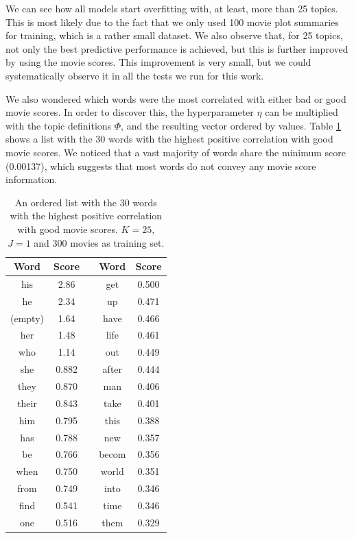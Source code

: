 \documentclass{article} %
\begin{document}
We can see how all models start overfitting with, at least, more than 25 topics.
This is most likely due to the fact that we only used 100 movie plot summaries for training, which is a rather small dataset. 
We also observe that, for 25 topics, not only the best predictive performance is achieved, but this is further improved by using the movie scores.
This improvement is very small, but we could systematically observe it in all the tests we run for this work. 

We also wondered which words were the most correlated with either bad or good movie scores. In order to discover this, the hyperparameter $\eta$ can be multiplied with the topic definitions $\Phi$, and the resulting vector ordered by values. Table \ref{table:word_scores} shows a list with the 30 words with the highest positive correlation with good movie scores. We noticed that a vast majority of words share the minimum score (0.00137), which suggests that most words do not convey any movie score information.

\begin{table}[ht!]
\captionsetup{justification=centering}
\caption{An ordered list with the 30 words with the highest positive correlation\\with good movie scores. $K = 25$, $J = 1$ and 300 movies as training set.}
\label{table:word_scores}
\begin{center}
\begin{tabular}{c|ccc|c}
Word & Score  & \hspace*{1cm} & Word & Score \\ \hline
his &	 2.86 &&	get &	 0.500 \\
he &	 2.34 &&	up &	 0.471 \\
(empty) &1.64 &&	have &	 0.466 \\
her &	 1.48 &&	life &	 0.461 \\
who &	 1.14 &&	out &	 0.449 \\
she &	 0.882 &&	after &	 0.444 \\
they &	 0.870 &&	man &	 0.406 \\
their &	 0.843 &&	take &	 0.401 \\
him &	 0.795 &&	this &	 0.388 \\
has &	 0.788 &&	new &	 0.357 \\
be &	 0.766 &&	becom &	 0.356 \\
when &	 0.750 &&	world &	 0.351 \\
from &	 0.749 &&	into &	 0.346 \\
find &	 0.541 &&	time &	 0.346 \\
one &	 0.516 &&	them &	 0.329
\end{tabular}
\end{center}
\end{table}
\end{document}
